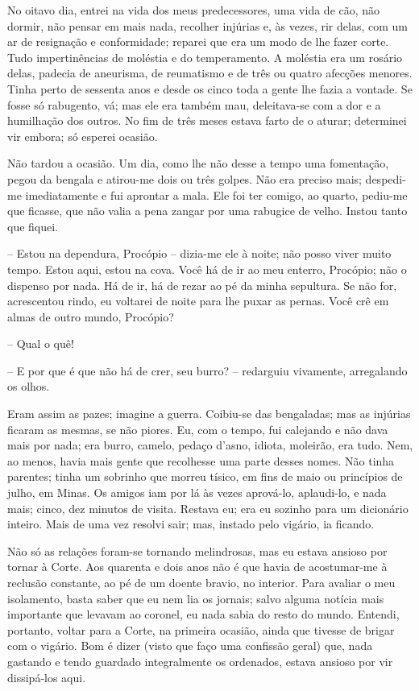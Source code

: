 No oitavo dia, entrei na vida dos meus predecessores, uma vida de cão,
não dormir, não pensar em mais nada, recolher injúrias e, às vezes, rir
delas, com um ar de resignação e conformidade; reparei que era um modo
de lhe fazer corte. Tudo impertinências de moléstia e do temperamento. A
moléstia era um rosário delas, padecia de aneurisma, de reumatismo e de
três ou quatro afecções menores. Tinha perto de sessenta anos e desde os
cinco toda a gente lhe fazia a vontade. Se fosse só rabugento, vá; mas
ele era também mau, deleitava-se com a dor e a humilhação dos outros. No
fim de três meses estava farto de o aturar; determinei vir embora; só
esperei ocasião.

Não tardou a ocasião. Um dia, como lhe não desse a tempo uma fomentação,
pegou da bengala e atirou-me dois ou três golpes. Não era preciso mais;
despedi-me imediatamente e fui aprontar a mala. Ele foi ter comigo, ao
quarto, pediu-me que ficasse, que não valia a pena zangar por uma
rabugice de velho. Instou tanto que fiquei.

-- Estou na dependura, Procópio -- dizia-me ele à noite; não posso viver
muito tempo. Estou aqui, estou na cova. Você há de ir ao meu enterro,
Procópio; não o dispenso por nada. Há de ir, há de rezar ao pé da minha
sepultura. Se não for, acrescentou rindo, eu voltarei de noite para lhe
puxar as pernas. Você crê em almas de outro mundo, Procópio?

-- Qual o quê!

-- E por que é que não há de crer, seu burro? -- redarguiu vivamente,
arregalando os olhos.

Eram assim as pazes; imagine a guerra. Coibiu-se das bengaladas; mas as
injúrias ficaram as mesmas, se não piores. Eu, com o tempo, fui
calejando e não dava mais por nada; era burro, camelo, pedaço d'asno,
idiota, moleirão, era tudo. Nem, ao menos, havia mais gente que
recolhesse uma parte desses nomes. Não tinha parentes; tinha um sobrinho
que morreu tísico, em fins de maio ou princípios de julho, em Minas. Os
amigos iam por lá às vezes aprová-lo, aplaudi-lo, e nada mais; cinco,
dez minutos de visita. Restava eu; era eu sozinho para um dicionário
inteiro. Mais de uma vez resolvi sair; mas, instado pelo vigário, ia
ficando.

Não só as relações foram-se tornando melindrosas, mas eu estava ansioso
por tornar à Corte. Aos quarenta e dois anos não é que havia de
acostumar-me à reclusão constante, ao pé de um doente bravio, no
interior. Para avaliar o meu isolamento, basta saber que eu nem lia os
jornais; salvo alguma notícia mais importante que levavam ao coronel, eu
nada sabia do resto do mundo. Entendi, portanto, voltar para a Corte, na
primeira ocasião, ainda que tivesse de brigar com o vigário. Bom é dizer
(visto que faço uma confissão geral) que, nada gastando e tendo guardado
integralmente os ordenados, estava ansioso por vir dissipá-los aqui.

